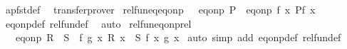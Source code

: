\begin{isabellebody}
%
\isadelimproof
%
\endisadelimproof
%
\isatagproof
{}\isamarkupfalse%
\ apfst{\isacharunderscore}{\kern0pt}def\ \isamarkupfalse%
\ transfer{\isacharunderscore}{\kern0pt}prover%
\endisatagproof
{\isafoldproof}%
%
\isadelimproof
\isanewline
%
\endisadelimproof
\isanewline
{}\isamarkupfalse%
\ rel{\isacharunderscore}{\kern0pt}fun{\isacharunderscore}{\kern0pt}eq{\isacharunderscore}{\kern0pt}eq{\isacharunderscore}{\kern0pt}onp{\isacharcolon}{\kern0pt}\ {\isachardoublequoteopen}{\isacharparenleft}{\kern0pt}{\isacharparenleft}{\kern0pt}{\isacharequal}{\kern0pt}{\isacharparenright}{\kern0pt}\ {\isacharequal}{\kern0pt}{\isacharequal}{\kern0pt}{\isacharequal}{\kern0pt}{\isachargreater}{\kern0pt}\ eq{\isacharunderscore}{\kern0pt}onp\ P{\isacharparenright}{\kern0pt}\ {\isacharequal}{\kern0pt}\ eq{\isacharunderscore}{\kern0pt}onp\ {\isacharparenleft}{\kern0pt}{\isasymlambda}f{\isachardot}{\kern0pt}\ {\isasymforall}x{\isachardot}{\kern0pt}\ P{\isacharparenleft}{\kern0pt}f\ x{\isacharparenright}{\kern0pt}{\isacharparenright}{\kern0pt}{\isachardoublequoteclose}\isanewline
%
\isadelimproof
%
\endisadelimproof
%
\isatagproof
{}\isamarkupfalse%
\ eq{\isacharunderscore}{\kern0pt}onp{\isacharunderscore}{\kern0pt}def\ rel{\isacharunderscore}{\kern0pt}fun{\isacharunderscore}{\kern0pt}def\ \isamarkupfalse%
\ auto%
\endisatagproof
{\isafoldproof}%
%
\isadelimproof
\isanewline
%
\endisadelimproof
\isanewline
{}\isamarkupfalse%
\ rel{\isacharunderscore}{\kern0pt}fun{\isacharunderscore}{\kern0pt}eq{\isacharunderscore}{\kern0pt}onp{\isacharunderscore}{\kern0pt}rel{\isacharcolon}{\kern0pt}\isanewline
\ \ \ {\isachardoublequoteopen}{\isacharparenleft}{\kern0pt}{\isacharparenleft}{\kern0pt}eq{\isacharunderscore}{\kern0pt}onp\ R{\isacharparenright}{\kern0pt}\ {\isacharequal}{\kern0pt}{\isacharequal}{\kern0pt}{\isacharequal}{\kern0pt}{\isachargreater}{\kern0pt}\ S{\isacharparenright}{\kern0pt}\ {\isacharequal}{\kern0pt}\ {\isacharparenleft}{\kern0pt}{\isasymlambda}f\ g{\isachardot}{\kern0pt}\ {\isasymforall}x{\isachardot}{\kern0pt}\ R\ x\ {\isasymlongrightarrow}\ S\ {\isacharparenleft}{\kern0pt}f\ x{\isacharparenright}{\kern0pt}\ {\isacharparenleft}{\kern0pt}g\ x{\isacharparenright}{\kern0pt}{\isacharparenright}{\kern0pt}{\isachardoublequoteclose}\isanewline
%
\isadelimproof
%
\endisadelimproof
%
\isatagproof
{}\isamarkupfalse%
\ {\isacharparenleft}{\kern0pt}auto\ simp\ add{\isacharcolon}{\kern0pt}\ eq{\isacharunderscore}{\kern0pt}onp{\isacharunderscore}{\kern0pt}def\ rel{\isacharunderscore}{\kern0pt}fun{\isacharunderscore}{\kern0pt}def{\isacharparenright}{\kern0pt}%

\end{isabellebody}
